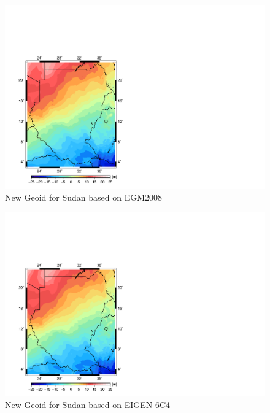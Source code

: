         \begin{figure}[t]
        	\caption{New Geoid for Sudan based on EGM2008}
        	\label{figure:datum_egm2008}
        	\includegraphics{Figures/cropped_egm2008.pdf}
        	\centering
        \end{figure}
        
        \begin{figure}[t]
              	\caption{New Geoid for Sudan based on EIGEN-6C4}
              	\label{figure:datum_eigen6c4}
              	\includegraphics{Figures/cropped_eigen6c4.pdf}
              	\centering
        \end{figure}
        
